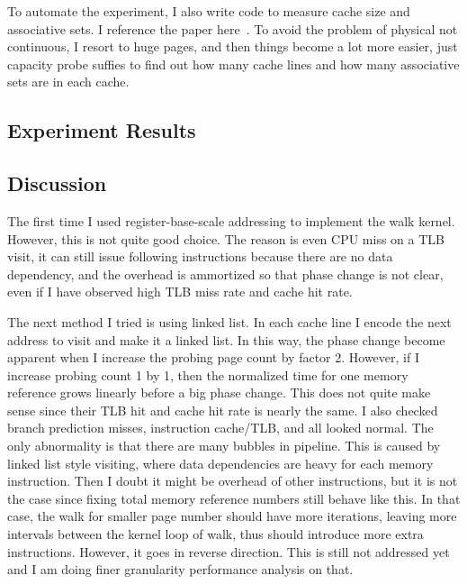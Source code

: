 To automate the experiment, I also write code to measure cache size and
associative sets. I reference the paper here~\cite{sigmetrics:cache}. To avoid
the problem of physical not continuous, I resort to huge pages, and then things
become a lot more easier, just capacity probe suffies to find out how many
cache lines and how many associative sets are in each cache.

\subsection{Experiment Results}
%
%
%
%


\subsection{Discussion}
\label{subsec:tlb-discussion}
The first time I used register-base-scale addressing to implement the walk
kernel. However, this is not quite good choice. The reason is even CPU miss
on a TLB visit, it can still issue following instructions because there are
no data dependency, and the overhead is ammortized so that phase change is
not clear, even if I have observed high TLB miss rate and cache hit rate.

The next method I tried is using linked list. In each cache line I encode the
next address to visit and make it a linked list. In this way, the phase change
become apparent when I increase the probing page count by factor 2. However, if
I increase probing count 1 by 1, then the normalized time for one memory
reference grows linearly before a big phase change. This does not quite make
sense since their TLB hit and cache hit rate is nearly the same. I also checked
branch prediction misses, instruction cache/TLB, and all looked normal.  The
only abnormality is that there are many bubbles in pipeline. This is caused by
linked list style visiting, where data dependencies are heavy for each memory
instruction. Then I doubt it might be overhead of other instructions, but it is
not the case since fixing total memory reference numbers still behave like
this. In that case, the walk for smaller page number should have more
iterations, leaving more intervals between the kernel loop of walk, thus should
introduce more extra instructions. However, it goes in reverse direction. This
is still not addressed yet and I am doing finer granularity performance
analysis on that.
